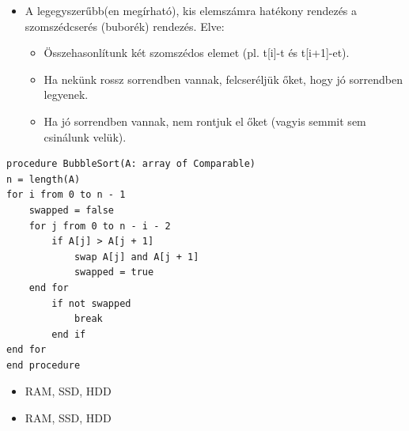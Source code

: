 \documentclass[12pt,a4paper]{article}
\begin{document}
            \begin{tcolorbox}[colback=blue!5!white,colframe=blue!50!black,title= 57. Ismertesse a szomszédcserés rendezés működését és komplexitását!]
                \begin{itemize}
                    \item A legegyszerűbb(en megírható), kis elemszámra hatékony rendezés a szomszédcserés (buborék) rendezés. Elve:
                    \begin{itemize}
                        
                        \item Összehasonlítunk két szomszédos elemet (pl. t[i]-t és t[i+1]-et).
                        \item Ha nekünk rossz sorrendben vannak, felcseréljük őket, hogy jó sorrendben legyenek.
                        \item Ha jó sorrendben vannak, nem rontjuk el őket (vagyis semmit sem csinálunk velük).
                    \end{itemize}
                \end{itemize}
                \begin{Verbatim}
procedure BubbleSort(A: array of Comparable)
n = length(A)
for i from 0 to n - 1
    swapped = false
    for j from 0 to n - i - 2
        if A[j] > A[j + 1]
            swap A[j] and A[j + 1]
            swapped = true
    end for
        if not swapped
            break
        end if
end for
end procedure                    
                \end{Verbatim}
            \end{tcolorbox}

            \begin{tcolorbox}[colback=blue!5!white,colframe=blue!50!black,title= 58. Melyik tároló tartalmaz a számítógépben D tárolót?]
                \begin{itemize}
                    \item RAM, SSD, HDD
                \end{itemize}
            \end{tcolorbox}

            \begin{tcolorbox}[colback=blue!5!white,colframe=blue!50!black,title= 59. Melyik tároló tartalmaz a számítógépben D tárolót?]
                \begin{itemize}
                    \item RAM, SSD, HDD
                \end{itemize}
            \end{tcolorbox}
\end{document}
